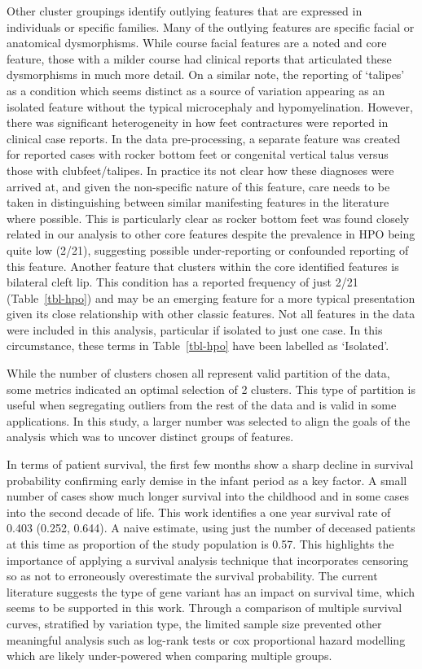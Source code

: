 \documentclass[
  authoryear,
  preprint,
  3p]{elsarticle}
\begin{document}
Other cluster groupings identify outlying features that are expressed in
individuals or specific families. Many of the outlying features are
specific facial or anatomical dysmorphisms. While course facial features
are a noted and core feature, those with a milder course had clinical
reports that articulated these dysmorphisms in much more detail. On a
similar note, the reporting of `talipes' as a condition which seems
distinct as a source of variation appearing as an isolated feature
without the typical microcephaly and hypomyelination. However, there was
significant heterogeneity in how feet contractures were reported in
clinical case reports. In the data pre-processing, a separate feature
was created for reported cases with rocker bottom feet or congenital
vertical talus versus those with clubfeet/talipes. In practice its not
clear how these diagnoses were arrived at, and given the non-specific
nature of this feature, care needs to be taken in distinguishing between
similar manifesting features in the literature where possible. This is
particularly clear as rocker bottom feet was found closely related in
our analysis to other core features despite the prevalence in HPO being
quite low (2/21), suggesting possible under-reporting or confounded
reporting of this feature. Another feature that clusters within the core
identified features is bilateral cleft lip. This condition has a
reported frequency of just 2/21 (Table~\ref{tbl-hpo}) and may be an
emerging feature for a more typical presentation given its close
relationship with other classic features. Not all features in the data
were included in this analysis, particular if isolated to just one case.
In this circumstance, these terms in Table~\ref{tbl-hpo} have been
labelled as `Isolated'.

While the number of clusters chosen all represent valid partition of the
data, some metrics indicated an optimal selection of 2 clusters. This
type of partition is useful when segregating outliers from the rest of
the data and is valid in some applications. In this study, a larger
number was selected to align the goals of the analysis which was to
uncover distinct groups of features.

In terms of patient survival, the first few months show a sharp decline
in survival probability confirming early demise in the infant period as
a key factor. A small number of cases show much longer survival into the
childhood and in some cases into the second decade of life. This work
identifies a one year survival rate of 0.403 (0.252, 0.644). A naive
estimate, using just the number of deceased patients at this time as
proportion of the study population is 0.57. This highlights the
importance of applying a survival analysis technique that incorporates
censoring so as not to erroneously overestimate the survival
probability. The current literature suggests the type of gene variant
has an impact on survival time, which seems to be supported in this
work. Through a comparison of multiple survival curves, stratified by
variation type, the limited sample size prevented other meaningful
analysis such as log-rank tests or cox proportional hazard modelling
which are likely under-powered when comparing multiple groups.
\end{document}
